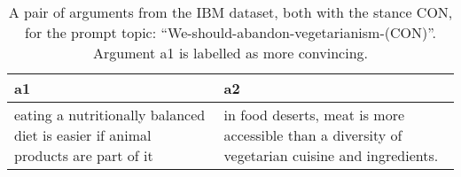 \begin{table}
\centering
\caption{A pair of arguments from the IBM dataset, both with the stance CON, for the prompt topic: ``We-should-abandon-vegetarianism-(CON)''. Argument a1 is labelled as more convincing.}
\begin{tabular}{p{6cm}|p{6cm}}
\toprule
                                                                               a1 &                                                                                                a2 \\
\midrule
 eating a nutritionally balanced diet is easier if animal products are part of it &  in food deserts, meat is more accessible than a diversity of vegetarian cuisine and ingredients. \\
\bottomrule
\end{tabular}
\end{table}
